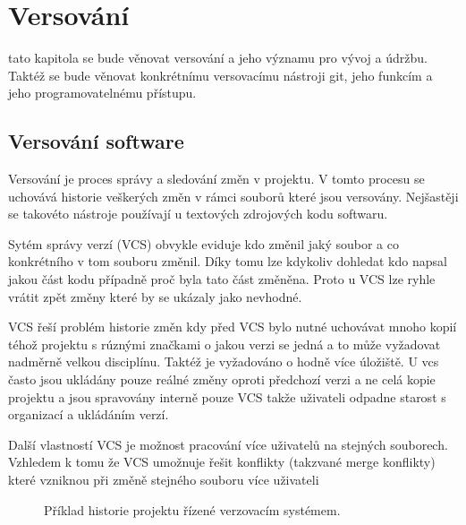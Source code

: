 
\chapter{Versování}
\label{sec:versioning}

tato kapitola se bude věnovat versování a jeho významu pro vývoj a údržbu. Taktéž se bude věnovat konkrétnímu versovacímu nástroji git, jeho funkcím a jeho programovatelnému přístupu.

\section{Versování software}
Versování je proces správy a sledování změn v projektu. V tomto procesu se uchovává historie veškerých změn v rámci souborů které jsou versovány. Nejšastěji se takovéto nástroje používají u textových zdrojových kodu softwaru. 

Sytém správy verzí (VCS)  obvykle eviduje kdo změnil jaký soubor a co konkrétního v tom souboru změnil. Díky tomu lze kdykoliv dohledat kdo napsal jakou část kodu případně proč byla tato část změněna. Proto u VCS lze ryhle vrátit zpět změny které by se ukázaly jako nevhodné.

VCS řeší problém historie změn kdy před VCS bylo nutné uchovávat mnoho kopií téhož projektu s rúznými značkami o jakou verzi se jedná a to může vyžadovat nadměrně velkou disciplínu. Taktéž je vyžadováno o hodně více úložiště. U vcs často jsou ukládány pouze reálné změny oproti předchozí verzi a ne celá kopie projektu a jsou spravovány interně pouze VCS takže uživateli odpadne starost s organizací a ukládáním verzí.

Další vlastností VCS je možnost pracování více uživatelů na stejných souborech. Vzhledem k tomu že VCS umožnuje řešit konflikty (takzvané merge konflikty) které vzniknou při změně stejného souboru více uživateli


\begin{figure}[ht]
	\centering
	
	\caption{Příklad historie projektu řízené verzovacím systémem.}
	\label{svg:revision_controlled_project_visualization}
\end{figure}

